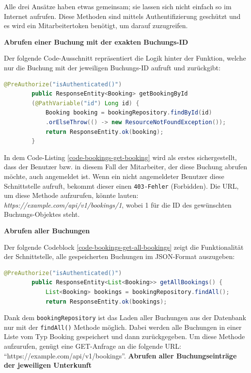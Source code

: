	Alle drei Ansätze haben etwas gemeinsam; sie lassen sich nicht einfach so im Internet aufrufen. Diese Methoden sind mittels Authentifizierung geschützt und es wird ein Mitarbeitertoken benötigt, um darauf zuzugreifen.
	
	\textbf{Abrufen einer Buchung mit der exakten Buchungs-ID}
	
	Der folgende Code-Ausschnitt repräsentiert die Logik hinter der Funktion, welche nur die Buchung mit der jeweiligen Buchungs-ID aufruft und zurückgibt:
	
	\begin{lstlisting}[caption={Aufrufen einer spezifischen Buchung mit der jeweiligen ID.}, label={code-bookings-get-booking}, language=Java]
		@PreAuthorize("isAuthenticated()")
		public ResponseEntity<Booking> getBookingById
		(@PathVariable("id") Long id) {
			Booking booking = bookingRepository.findById(id)
			.orElseThrow(() -> new ResourceNotFoundException());
			return ResponseEntity.ok(booking);
		}
	\end{lstlisting}
	
	In dem Code-Listing \ref{code-bookings-get-booking} wird als erstes sichergestellt, dass der Benutzer bzw. in diesem Fall der Mitarbeiter, der diese Buchung abrufen möchte, auch angemeldet ist. Wenn ein nicht angemeldeter Benutzer diese Schnittstelle aufruft, bekommt dieser einen \texttt{403-Fehler} (Forbidden). Die URL, um diese Methode aufzurufen, könnte lauten: \textit{https://example.com/api/v1/bookings/1}, wobei 1 für die ID des gewünschten Buchungs-Objektes steht. 
	
	\textbf{Abrufen aller Buchungen}
	
	Der folgende Codeblock \ref{code-bookings-get-all-bookings} zeigt die Funktionalität der Schnittstelle, alle gespeicherten Buchungen im JSON-Format auszugeben:
	
	\begin{lstlisting}[caption={Aufrufen aller in der Datenbank gespeicherten Buchungen.}, label={code-bookings-get-all-bookings}, language=Java]
		@PreAuthorize("isAuthenticated()")
		public ResponseEntity<List<Booking>> getAllBookings() {
			List<Booking> bookings = bookingRepository.findAll();
			return ResponseEntity.ok(bookings);
		\end{lstlisting}
		
		Dank dem \texttt{bookingRepository} ist das Laden aller Buchungen aus der Datenbank nur mit der \texttt{findAll()} Methode möglich. Dabei werden alle Buchungen in einer Liste vom Typ Booking gespeichert und dann zurückgegeben. Um diese Methode aufzurufen, genügt eine GET-Anfrage an die folgende URL: \newline
        \enquote{https://example.com/api/v1/bookings}.
		\newpage
		\textbf{Abrufen aller Buchungseinträge der jeweiligen Unterkunft}
		
